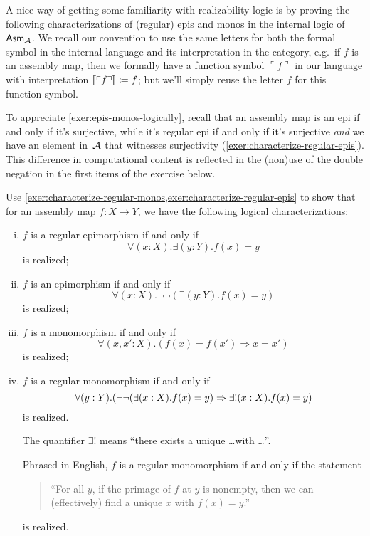 A nice way of getting some familiarity with realizability logic is by proving
the following characterizations of (regular) epis and monos in the internal
logic of \(\Asm{\AA}\).
%
We recall our convention to use the same letters for both the formal symbol in
the internal language and its interpretation in the category, e.g.\ if \(f\) is
an assembly map, then we formally have a function symbol
\(\ulcorner f \urcorner\) in our language with interpretation
\(\sem{\ulcorner f \urcorner} \coloneqq f\); but we'll simply reuse the letter
\(f\) for this function symbol.

To appreciate \cref{exer:epis-monos-logically}, recall that an assembly map is
an epi if and only if it's surjective, while it's regular epi if and only if
it's surjective \emph{and} we have an element in~\(\AA\) that witnesses
surjectivity (\cref{exer:characterize-regular-epis}).
%
This difference in computational content is reflected in the (non)use of the
double negation in the first items of the exercise below.

\begin{exercise}\label{exer:epis-monos-logically}
  Use \cref{exer:characterize-regular-monos,exer:characterize-regular-epis} to
  show that for an assembly map \({f \colon X \to Y}\), we have the following
  logical characterizations:
  \begin{enumerate}[(i)]
  \item \(f\) is a regular epimorphism if and only if
    \[
      \forall(x : X).\exists(y : Y).f(x) = y
    \]
    is realized;
  \item \(f\) is an epimorphism if and only if
    \[
      \forall(x : X).\lnot\lnot({\exists(y : Y).f(x) = y})
    \]
    is realized;
  \item \(f\) is a monomorphism if and only if
    \[
      \forall(x, x' : X).(f(x) = f(x') \Rightarrow x = x')
    \]
    is realized;
  \item \(f\) is a regular monomorphism if and only if
    \[
      \forall(y : Y).\pa*{\lnot\lnot\pa*{\exists(x : X).f(x) = y} \Rightarrow \exists!(x : X).f(x) = y}
    \]
    is realized.

    The quantifier \(\exists!\) means ``there exists a unique \dots with \dots''.

    Phrased in English, \(f\) is a regular monomorphism if and only if the statement
    \begin{quote}{``For all \(y\), if the primage of \(f\) at \(y\) is nonempty,
        then we can (effectively) find a unique \(x\) with \(f(x) = y\).''}
    \end{quote}
    is realized.
  \end{enumerate}
\end{exercise}


